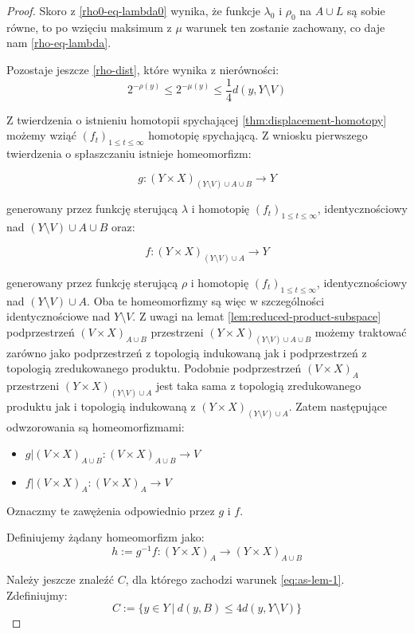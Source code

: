 \begin{lem}
\begin{proof}
    Skoro z \eqref{rho0-eq-lambda0} wynika, że funkcje $\lambda_0$ i $\rho_0$ na $A \cup L$ są sobie równe, to po wzięciu maksimum z $\mu$ warunek ten zostanie zachowany, co daje nam \eqref{rho-eq-lambda}.
    
    Pozostaje jeszcze \eqref{rho-dist}, które wynika z nierówności:
    \[2^{-\rho(y)} \leq 2^{-\mu(y)} \leq \frac{1}{4} d(y, Y \setminus V)\]
    
    Z twierdzenia o istnieniu homotopii spychającej \ref{thm:displacement-homotopy} możemy wziąć $(f_t)_{1 \leq t \leq \infty}$ homotopię spychającą.
    Z wniosku pierwszego twierdzenia o spłaszczaniu istnieje homeomorfizm:
    
    \[g: (Y \times X)_{(Y \setminus V) \cup A \cup B} \rightarrow Y\]
    
    generowany przez funkcję sterującą $\lambda$ i homotopię $(f_t)_{1 \leq t \leq \infty}$, identycznościowy nad $(Y \setminus V) \cup A \cup B$ oraz:
    
    \[f: (Y \times X)_{(Y \setminus V) \cup A} \rightarrow Y\]
    
    generowany przez funkcję sterującą $\rho$ i homotopię $(f_t)_{1 \leq t \leq \infty}$, identycznościowy nad $(Y \setminus V) \cup A$. Oba te homeomorfizmy są więc w szczególności identycznościowe nad $Y \setminus V$. Z uwagi na lemat \ref{lem:reduced-product-subspace} podprzestrzeń $(V\times X)_{A\cup B}$ przestrzeni $(Y\times X)_{(Y\setminus V)\cup A\cup B}$ możemy traktować zarówno jako podprzestrzeń z topologią indukowaną jak i podprzestrzeń z topologią zredukowanego produktu. Podobnie podprzestrzeń $(V\times X)_{A}$ przestrzeni $(Y\times X)_{(Y\setminus V)\cup A}$ jest taka sama z topologią zredukowanego produktu jak i topologią indukowaną z $(Y\times X)_{(Y\setminus V)\cup A}$. Zatem następujące odwzorowania są homeomorfizmami:
    \begin{itemize}
     \item $g|(V \times X)_{A \cup B}: (V \times X)_{A \cup B} \to V$
     \item $f|(V \times X)_{A}: (V \times X)_{A} \to V$
    \end{itemize}

    Oznaczmy te zawężenia odpowiednio przez $g$ i $f$.
    
    Definiujemy żądany homeomorfizm jako:
    \[h := g^{-1} f: (Y \times X)_{A} \rightarrow (Y \times X)_{A \cup B}\]
    
    Należy jeszcze znaleźć $C$, dla którego zachodzi warunek \eqref{eq:as-lem-1}. Zdefiniujmy:
    \[C := \{y \in Y\ |\ d(y,B) \leq 4 d(y, Y \setminus V)\}\]
    

\end{proof}
\end{lem}
